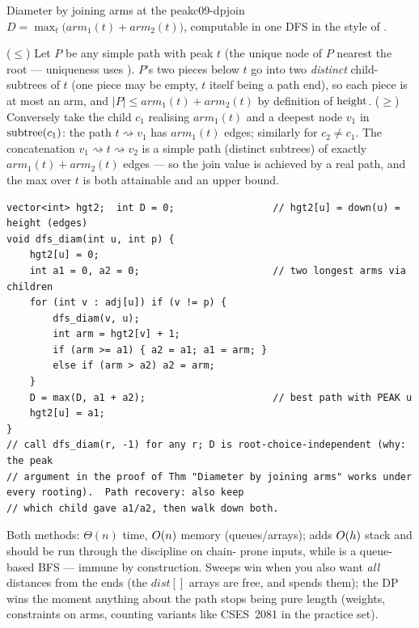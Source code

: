 \begin{theorem}{Diameter by joining arms at the peak}{c09-dpjoin}
$D = \max_t \big(\mathit{arm}_1(t) + \mathit{arm}_2(t)\big)$, computable in one DFS in
the style of .
\end{theorem}
\begin{proofbox}
($\le$) Let $P$ be any simple path with peak $t$ (the unique node of $P$ nearest the
root --- uniqueness uses ). $P$'s two pieces below $t$ go into
two \emph{distinct} child-subtrees of $t$ (one piece may be empty, $t$ itself being a
path end), so each piece is at most an arm, and $|P| \le \mathit{arm}_1(t)+\mathit{arm}_2(t)$
by definition of $\operatorname{height}$. ($\ge$) Conversely take the child $c_1$ realising
$\mathit{arm}_1(t)$ and a deepest node $v_1$ in $\operatorname{subtree}(c_1)$: the path $t \rightsquigarrow
v_1$ has $\mathit{arm}_1(t)$ edges; similarly for $c_2 \ne c_1$. The concatenation
$v_1 \rightsquigarrow t \rightsquigarrow v_2$ is a simple path (distinct subtrees) of
exactly $\mathit{arm}_1(t)+\mathit{arm}_2(t)$ edges --- so the join value is achieved by
a real path, and the max over $t$ is both attainable and an upper bound.
\end{proofbox}

\begin{lstlisting}[caption={DP diameter inside the measures fold: keep the two longest arms at each node}, label={lst:c09-dp}]
vector<int> hgt2;  int D = 0;                 // hgt2[u] = down(u) = height (edges)
void dfs_diam(int u, int p) {
    hgt2[u] = 0;
    int a1 = 0, a2 = 0;                       // two longest arms via children
    for (int v : adj[u]) if (v != p) {
        dfs_diam(v, u);
        int arm = hgt2[v] + 1;
        if (arm >= a1) { a2 = a1; a1 = arm; }
        else if (arm > a2) a2 = arm;
    }
    D = max(D, a1 + a2);                      // best path with PEAK u
    hgt2[u] = a1;
}
// call dfs_diam(r, -1) for any r; D is root-choice-independent (why: the peak
// argument in the proof of Thm "Diameter by joining arms" works under every rooting).  Path recovery: also keep
// which child gave a1/a2, then walk down both.
\end{lstlisting}

\begin{complexitybox}
Both methods: $\Theta(n)$ time, $O(n)$ memory (queues/arrays);  adds
$O(h)$ stack and should be run through the  discipline on chain-
prone inputs, while  is a queue-based BFS --- immune by construction.
Sweeps win when you also want \emph{all} distances from the ends (the $\mathit{dist}[]$
arrays are free, and  spends them); the DP wins the moment anything
about the path stops being pure length (weights, constraints on arms, counting variants
like CSES~2081 in the practice set).
\end{complexitybox}

